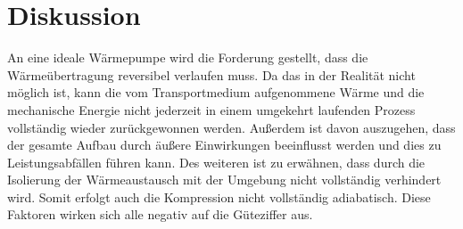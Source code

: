 \section{Diskussion}
\label{sec:Diskussion}
An eine ideale Wärmepumpe wird die Forderung gestellt, dass die Wärmeübertragung reversibel verlaufen muss.
Da das in der Realität nicht möglich ist, kann die vom Transportmedium aufgenommene Wärme 
und die mechanische Energie nicht jederzeit in einem umgekehrt laufenden Prozess vollständig wieder zurückgewonnen werden.
Außerdem ist davon auszugehen, dass der gesamte Aufbau durch äußere Einwirkungen beeinflusst werden und dies zu Leistungsabfällen führen kann.
Des weiteren ist zu erwähnen, dass durch die Isolierung der Wärmeaustausch mit der Umgebung nicht vollständig verhindert wird. 
Somit erfolgt auch die Kompression nicht vollständig adiabatisch.
Diese Faktoren wirken sich alle negativ auf die Güteziffer aus.